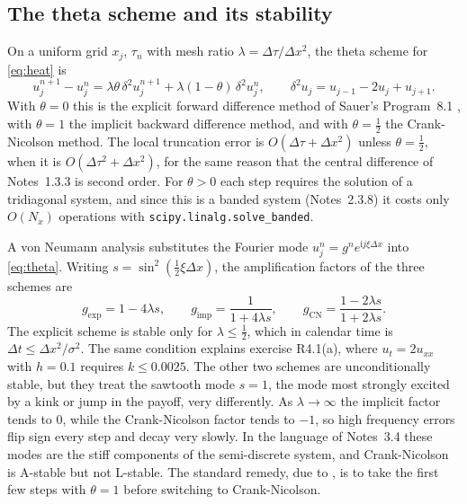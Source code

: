 \documentclass[11pt,a4paper]{article}
\begin{document}
\subsection{The theta scheme and its stability}

On a uniform grid $x_j$, $\tau_n$ with mesh ratio $\lambda = \Delta\tau/\Delta x^2$, the theta scheme for \eqref{eq:heat} is
\begin{equation}
u_j^{n+1} - u_j^n = \lambda\theta\,\delta^2u_j^{n+1} + \lambda(1-\theta)\,\delta^2u_j^n, \qquad \delta^2u_j = u_{j-1} - 2u_j + u_{j+1}. \label{eq:theta}
\end{equation}
With $\theta = 0$ this is the explicit forward difference method of Sauer's Program~8.1 \citep{sauer2018}, with $\theta = 1$ the implicit backward difference method, and with $\theta = \frac{1}{2}$ the Crank-Nicolson method. The local truncation error is $O(\Delta\tau + \Delta x^2)$ unless $\theta = \frac{1}{2}$, when it is $O(\Delta\tau^2 + \Delta x^2)$, for the same reason that the central difference of Notes~1.3.3 is second order. For $\theta > 0$ each step requires the solution of a tridiagonal system, and since this is a banded system (Notes~2.3.8) it costs only $O(N_x)$ operations with \texttt{scipy.linalg.solve\_banded}.

A von Neumann analysis substitutes the Fourier mode $u_j^n = g^ne^{\mathrm{i}j\xi\Delta x}$ into \eqref{eq:theta}. Writing $s = \sin^2(\frac{1}{2}\xi\Delta x)$, the amplification factors of the three schemes are
\begin{equation}
g_{\mathrm{exp}} = 1 - 4\lambda s, \qquad g_{\mathrm{imp}} = \frac{1}{1 + 4\lambda s}, \qquad g_{\mathrm{CN}} = \frac{1 - 2\lambda s}{1 + 2\lambda s}. \label{eq:amp}
\end{equation}
The explicit scheme is stable only for $\lambda \le \frac{1}{2}$, which in calendar time is $\Delta t \le \Delta x^2/\sigma^2$. The same condition explains exercise R4.1(a), where $u_t = 2u_{xx}$ with $h = 0.1$ requires $k \le 0.0025$. The other two schemes are unconditionally stable, but they treat the sawtooth mode $s = 1$, the mode most strongly excited by a kink or jump in the payoff, very differently. As $\lambda \to \infty$ the implicit factor tends to 0, while the Crank-Nicolson factor tends to $-1$, so high frequency errors flip sign every step and decay very slowly. In the language of Notes~3.4 these modes are the stiff components of the semi-discrete system, and Crank-Nicolson is A-stable but not L-stable. The standard remedy, due to \citet{rannacher1984}, is to take the first few steps with $\theta = 1$ before switching to Crank-Nicolson.
\end{document}
